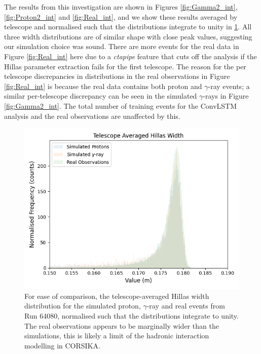 The results from this investigation are shown in Figures \ref{fig:Gamma2_int}, \ref{fig:Proton2_int} and \ref{fig:Real_int}, and we show these results averaged by telescope and normalised such that the distributions integrate to unity in \ref{fig:telaveragedwidth}. All three width distributions are of similar shape with close peak values, suggesting our simulation choice was sound. There are more events for the real data in Figure \ref{fig:Real_int} here due to a \textit{ctapipe} feature that cuts off the analysis if the Hillas parameter extraction fails for the first telescope. The reason for the per telescope discrepancies in distributions in the real observations in Figure \ref{fig:Real_int} is because the real data contains both proton and $\gamma$-ray events; a similar per-telescope discrepancy can be seen in the simulated $\gamma$-rays in Figure \ref{fig:Gamma2_int}. The total number of training events for the ConvLSTM analysis and the real observations are unaffected by this.
\begin{figure}[ht] 
        \centering \includegraphics[width=\columnwidth]{figures/telaveragedwidth.png}

        \caption{
                \label{fig:telaveragedwidth} For ease of comparison, the telescope-averaged Hillas width distribution for the simulated proton, $\gamma$-ray and real events from Run 64080, normalised such that the distributions integrate to unity. The real observations appears to be marginally wider than the simulations, this is likely a limit of the hadronic interaction modelling in CORSIKA.
        }
\end{figure}
